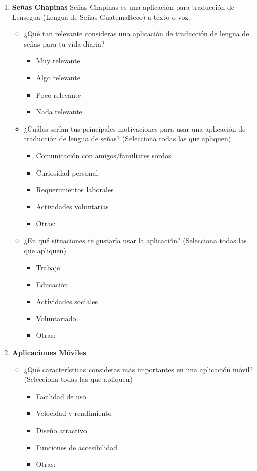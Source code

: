 \begin{enumerate}
    \item \textbf{Señas Chapinas}
    Señas Chapinas es una aplicación para traducción de Lensegua (Lengua de Señas Guatemalteco) a texto o voz.
    \begin{itemize}
        \item ¿Qué tan relevante consideras una aplicación de traducción de lengua de señas para tu vida diaria?
        \begin{itemize}
            \item Muy relevante
            \item Algo relevante
            \item Poco relevante
            \item Nada relevante
        \end{itemize}
        \item ¿Cuáles serían tus principales motivaciones para usar una aplicación de traducción de lengua de señas? (Selecciona todas las que apliquen)
        \begin{itemize}
            \item Comunicación con amigos/familiares sordos
            \item Curiosidad personal
            \item Requerimientos laborales
            \item Actividades voluntarias
            \item Otras: \underline{\hspace{5cm}}
        \end{itemize}
        \item ¿En qué situaciones te gustaría usar la aplicación? (Selecciona todas las que apliquen)
        \begin{itemize}
            \item Trabajo
            \item Educación
            \item Actividades sociales
            \item Voluntariado
            \item Otras: \underline{\hspace{5cm}}
        \end{itemize}
    \end{itemize}

    \item \textbf{Aplicaciones Móviles}
    \begin{itemize}
        \item ¿Qué características consideras más importantes en una aplicación móvil? (Selecciona todas las que apliquen)
        \begin{itemize}
            \item Facilidad de uso
            \item Velocidad y rendimiento
            \item Diseño atractivo
            \item Funciones de accesibilidad
            \item Otras: \underline{\hspace{5cm}}
        \end{itemize}
    \end{itemize}


\end{enumerate}

